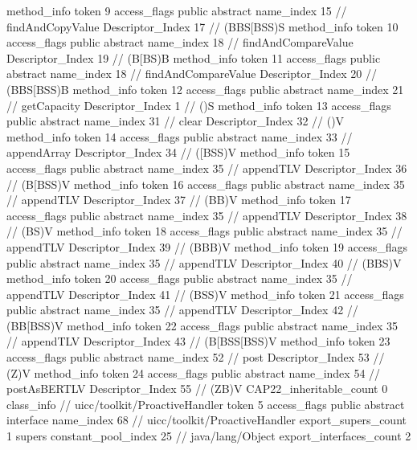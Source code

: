 {{{{{				}
				method_info {
					token	9
					access_flags	public abstract
					name_index	15		// findAndCopyValue
					Descriptor_Index	17		// (BBS[BSS)S
				}
				method_info {
					token	10
					access_flags	public abstract
					name_index	18		// findAndCompareValue
					Descriptor_Index	19		// (B[BS)B
				}
				method_info {
					token	11
					access_flags	public abstract
					name_index	18		// findAndCompareValue
					Descriptor_Index	20		// (BBS[BSS)B
				}
				method_info {
					token	12
					access_flags	public abstract
					name_index	21		// getCapacity
					Descriptor_Index	1		// ()S
				}
				method_info {
					token	13
					access_flags	public abstract
					name_index	31		// clear
					Descriptor_Index	32		// ()V
				}
				method_info {
					token	14
					access_flags	public abstract
					name_index	33		// appendArray
					Descriptor_Index	34		// ([BSS)V
				}
				method_info {
					token	15
					access_flags	public abstract
					name_index	35		// appendTLV
					Descriptor_Index	36		// (B[BSS)V
				}
				method_info {
					token	16
					access_flags	public abstract
					name_index	35		// appendTLV
					Descriptor_Index	37		// (BB)V
				}
				method_info {
					token	17
					access_flags	public abstract
					name_index	35		// appendTLV
					Descriptor_Index	38		// (BS)V
				}
				method_info {
					token	18
					access_flags	public abstract
					name_index	35		// appendTLV
					Descriptor_Index	39		// (BBB)V
				}
				method_info {
					token	19
					access_flags	public abstract
					name_index	35		// appendTLV
					Descriptor_Index	40		// (BBS)V
				}
				method_info {
					token	20
					access_flags	public abstract
					name_index	35		// appendTLV
					Descriptor_Index	41		// (BSS)V
				}
				method_info {
					token	21
					access_flags	public abstract
					name_index	35		// appendTLV
					Descriptor_Index	42		// (BB[BSS)V
				}
				method_info {
					token	22
					access_flags	public abstract
					name_index	35		// appendTLV
					Descriptor_Index	43		// (B[BSS[BSS)V
				}
				method_info {
					token	23
					access_flags	public abstract
					name_index	52		// post
					Descriptor_Index	53		// (Z)V
				}
				method_info {
					token	24
					access_flags	public abstract
					name_index	54		// postAsBERTLV
					Descriptor_Index	55		// (ZB)V
				}
			}
			CAP22_inheritable_count	0
		}
		class_info {		// uicc/toolkit/ProactiveHandler
			token	5
			access_flags	public abstract interface
			name_index	68		// uicc/toolkit/ProactiveHandler
			export_supers_count	1
			supers {
				constant_pool_index	25		// java/lang/Object
			}
			export_interfaces_count	2
}}}
